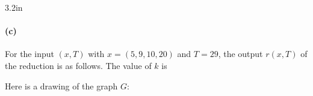 \begin{answerBox}{3.2in}   %

\paragraph{(c)}


For the input $(x, T)$ with $x=(5, 9, 10, 20)$ and $T=29$,
the output $r(x, T)$ of the reduction is as follows.
% 
The value of $k$ is

Here is a drawing of the graph $G$:
\smallskip

\begin{center}
\begin{blue}

  \REPLACEME
  

        








\end{blue}
\end{center}

\end{answerBox}


